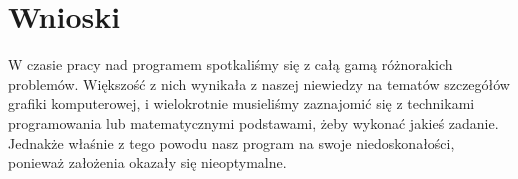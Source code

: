 \newpage
\part{\huge \textbf{Wnioski}}
	W czasie pracy nad programem spotkaliśmy się z całą gamą różnorakich problemów. Większość z nich wynikała z naszej niewiedzy na tematów szczegółów grafiki komputerowej, i wielokrotnie musieliśmy zaznajomić się z technikami programowania lub matematycznymi podstawami, żeby wykonać jakieś zadanie. Jednakże właśnie z tego powodu nasz program na swoje niedoskonałości, ponieważ założenia okazały się nieoptymalne.
